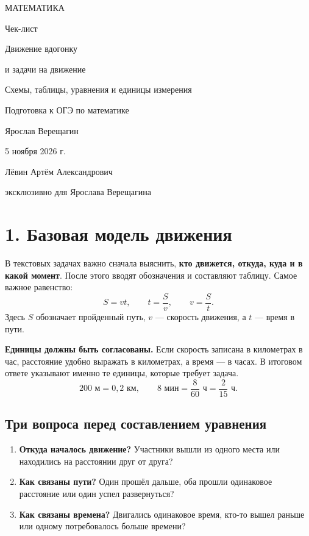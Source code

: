\documentclass[a4paper,12pt]{article}
\newcommand{\topic}[1]{\section*{\color{darkaccent}#1}}
\newcommand{\subtopic}[1]{\subsection*{\color{accent}#1}}
\newcommand{\key}[1]{\textbf{\color{darkaccent}#1}}
\newcommand{\kms}{\text{ км}}
\newcommand{\minu}{\text{ мин}}
\newcommand{\hour}{\text{ ч}}
\newcommand{\met}{\text{ м}}
\begin{document}
\thispagestyle{empty}
\begin{center}
\vspace*{20mm}
{\large\color{darkaccent}МАТЕМАТИКА}\par
\vspace{18mm}
{\LARGE Чек-лист}\par
\vspace{12mm}
{\LARGE\color{accent}Движение вдогонку\par и задачи на движение}\par
\vspace{9mm}
{\large Схемы, таблицы, уравнения и единицы измерения}\par
\vspace{10mm}
{\normalsize Подготовка к ОГЭ по математике}\par
\vfill
{\large Ярослав Верещагин}\par
\vspace{10mm}
5 ноября 2026 г.\par
\vspace{15mm}
{\small Лёвин Артём Александрович\par эксклюзивно для Ярослава Верещагина}\par
\vspace{8mm}
\vspace*{8mm}
\end{center}
\clearpage

\topic{1. Базовая модель движения}
В текстовых задачах важно сначала выяснить, \key{кто движется, откуда, куда и в какой момент}. После этого вводят обозначения и составляют таблицу. Самое важное равенство:
\[
\boxed{S=vt},\qquad t=\frac{S}{v},\qquad v=\frac{S}{t}.
\]
Здесь $S$ обозначает пройденный путь, $v$ --- скорость движения, а $t$ --- время в пути.

\key{Единицы должны быть согласованы.} Если скорость записана в километрах в час, расстояние удобно выражать в километрах, а время --- в часах. В итоговом ответе указывают именно те единицы, которые требует задача.
\[
200\met=0{,}2\kms,\qquad 8\minu=\frac{8}{60}\hour=\frac{2}{15}\hour.
\]

\subtopic{Три вопроса перед составлением уравнения}
\begin{enumerate}
\item \textbf{Откуда началось движение?} Участники вышли из одного места или находились на расстоянии друг от друга?
\item \textbf{Как связаны пути?} Один прошёл дальше, оба прошли одинаковое расстояние или один успел развернуться?
\item \textbf{Как связаны времена?} Двигались одинаковое время, кто-то вышел раньше или одному потребовалось больше времени?
\end{enumerate}
\end{document}
